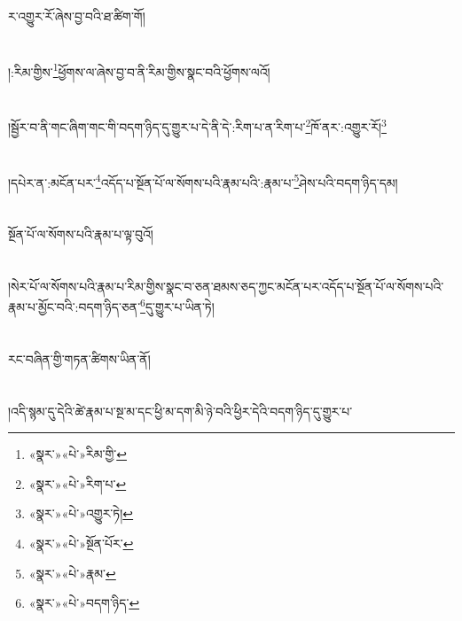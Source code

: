 ར་འགྱུར་རོ་ཞེས་བྱ་བའི་ཐ་ཚིག་གོ།\chapter{ }།:རིམ་གྱིས་\footnote{«སྣར་»«པེ་»རིམ་གྱི་}ཕྱོགས་ལ་ཞེས་བྱ་བ་ནི་རིམ་གྱིས་སྣང་བའི་ཕྱོགས་ལའོ།\chapter{ }།སྦྱོར་བ་ནི་གང་ཞིག་གང་གི་བདག་ཉིད་དུ་གྱུར་པ་དེ་ནི་དེ་:རིག་པ་ན་རིག་པ་\footnote{«སྣར་»«པེ་»རིག་པ་}ཁོ་ནར་:འགྱུར་རོ།\footnote{«སྣར་»«པེ་»འགྱུར་ཏེ།}\chapter{ }།དཔེར་ན་:མངོན་པར་\footnote{«སྣར་»«པེ་»སྔོན་པོར་}འདོད་པ་སྔོན་པོ་ལ་སོགས་པའི་རྣམ་པའི་:རྣམ་པ་\footnote{«སྣར་»«པེ་»རྣམ་}ཤེས་པའི་བདག་ཉིད་དམ།\chapter{ }སྔོན་པོ་ལ་སོགས་པའི་རྣམ་པ་ལྟ་བུའོ།\chapter{ }།སེར་པོ་ལ་སོགས་པའི་རྣམ་པ་རིམ་གྱིས་སྣང་བ་ཅན་ཐམས་ཅད་ཀྱང་མངོན་པར་འདོད་པ་སྔོན་པོ་ལ་སོགས་པའི་རྣམ་པ་མྱོང་བའི་:བདག་ཉིད་ཅན་\footnote{«སྣར་»«པེ་»བདག་ཉིད་}དུ་གྱུར་པ་ཡིན་ཏེ།\chapter{ }རང་བཞིན་གྱི་གཏན་ཚིགས་ཡིན་ནོ།\chapter{ }།འདི་སྙམ་དུ་དེའི་ཚེ་རྣམ་པ་སྔ་མ་དང་ཕྱི་མ་དག་མི་ཉེ་བའི་ཕྱིར་དེའི་བདག་ཉིད་དུ་གྱུར་པ་